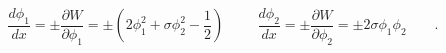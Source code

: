 \begin{equation}
\frac{d \phi_1}{dx}=\pm\frac{\partial W}{\partial \phi_1}=\pm
\left( 2 \phi_1^2+ \sigma \phi_2^2-\frac{1}{2}\right) \hspace{1cm}
\frac{d \phi_2}{dx}=\pm\frac{\partial W}{\partial \phi_2}=\pm 2
\sigma \phi_1 \phi_2 \qquad . \label{eq:bps}
\end{equation}


